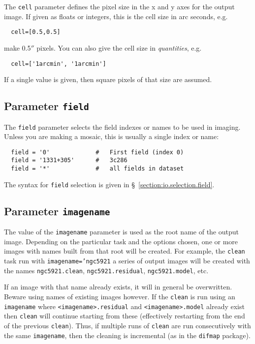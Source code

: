 The {\tt cell} parameter defines the pixel size in the
x and y axes for the output
image.  If given as floats or integers, this is the cell size
in arc seconds, e.g.
\small
\begin{verbatim}
  cell=[0.5,0.5]
\end{verbatim}
\normalsize
make 0.5$''$ pixels.
You can also give the cell size in {\it quantities}, e.g.
\small
\begin{verbatim}
  cell=['1arcmin', '1arcmin']
\end{verbatim}
\normalsize
If a single value is given, then square pixels of that size
are assumed.

\subsection{Parameter {\tt field} }
\label{section:im.pars.field}

The {\tt field} parameter selects the field indexes or names
to be used in imaging.  Unless you are making a mosaic, this
is usually a single index or name:
\small
\begin{verbatim}
  field = '0'             #   First field (index 0)
  field = '1331+305'      #   3c286
  field = '*'             #   all fields in dataset
\end{verbatim}
\normalsize

The syntax for {\tt field} selection is given in 
\S~\ref{section:io.selection.field}.

\subsection{Parameter {\tt imagename} }
\label{section:im.pars.imagename}

The value of the {\tt imagename} parameter is used as the root name
of the output image.  Depending on the particular task and the
options chosen, one or more images with names built from that root
will be created.  
For example, the {\tt clean} task run with
{\tt imagename='ngc5921} 
a series of output images will be created with the names
{\tt ngc5921.clean}, {\tt ngc5921.residual}, {\tt ngc5921.model}, etc.

If an image with that name already exists, it will in general
be overwritten.  Beware using names of existing images however.
If the {\tt clean} is run using an {\tt imagename} where 
{\tt <imagename>.residual} and {\tt <imagename>.model} already
exist then {\tt clean} will continue starting from these
(effectively restarting from the end of the previous {\tt clean}). 
Thus, if multiple runs of {\tt clean} are run consecutively
with the same {\tt imagename}, then the cleaning is incremental
(as in the {\tt difmap} package).

